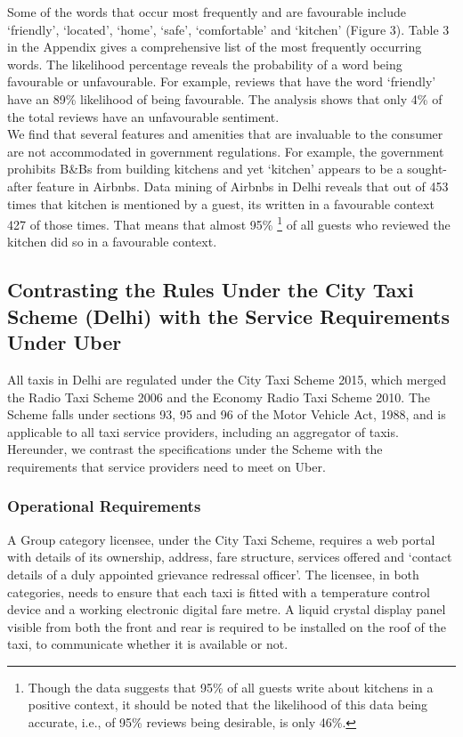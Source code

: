 \documentclass[a4paper, 12pt]{article}
\begin{document}
Some of the words that occur most frequently and are favourable include ‘friendly’, ‘located’, ‘home’, ‘safe’, ‘comfortable’ and ‘kitchen’ (Figure 3). Table 3 in the Appendix gives a comprehensive list of the most frequently occurring words. The likelihood percentage reveals the probability of a word being favourable or unfavourable. For example, reviews that have the word ‘friendly’ have an 89\% likelihood of being favourable. The analysis shows that only 4\% of the total reviews have an unfavourable sentiment.\\

We find that several features and amenities that are invaluable to the consumer are not accommodated in government regulations. For example, the government prohibits B\&Bs from building kitchens and yet ‘kitchen’ appears to be a sought-after feature in Airbnbs. Data mining of Airbnbs in Delhi reveals that out of 453 times that kitchen is mentioned by a guest, its written in a favourable context 427 of those times. That means that almost 95\%  \footnote {Though the data suggests that 95\% of all guests write about kitchens in a positive context, it should be noted that the likelihood of this data being accurate, i.e., of 95\% reviews being desirable, is only 46\%.} of all guests who reviewed the kitchen did so in a favourable context.\\

\subsection{Contrasting the Rules Under the City Taxi Scheme (Delhi) with the Service Requirements Under Uber}
All taxis in Delhi are regulated under the City Taxi Scheme 2015, which merged the Radio Taxi Scheme 2006 and the Economy Radio Taxi Scheme 2010. The Scheme falls under sections 93, 95 and 96 of the Motor Vehicle Act, 1988, and is applicable to all taxi service providers, including an aggregator of taxis. Hereunder, we contrast the specifications under the Scheme with the requirements that service providers need to meet on Uber.\\

\subsubsection{Operational Requirements}
A Group category licensee, under the City Taxi Scheme, requires a web portal with details of its ownership, address, fare structure, services offered and ‘contact details of a duly appointed grievance redressal officer’. The licensee, in both categories, needs to ensure that each taxi is fitted with a temperature control device and a working electronic digital fare metre. A liquid crystal display panel visible from both the front and rear is required to be installed on the roof of the taxi, to communicate whether it is available or not. \\ 
\end{document}
